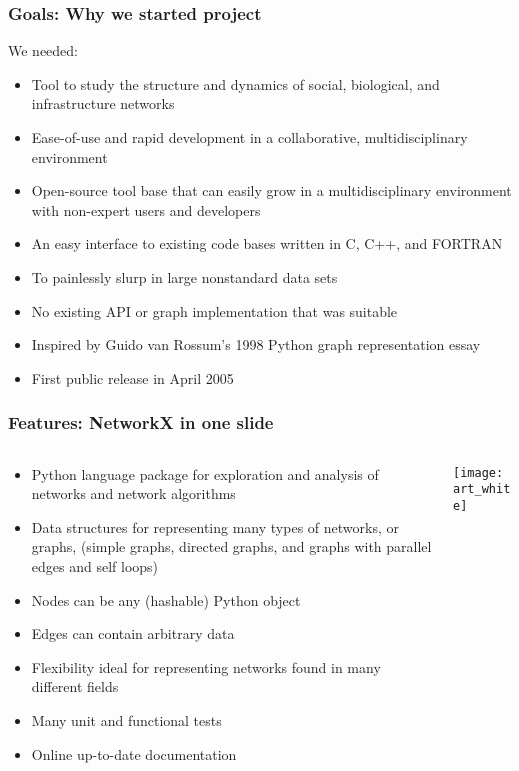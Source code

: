\documentclass[xcolor=dvipsnames, 9pt]{beamer}
\begin{document}
\begin{frame}
\frametitle{Goals: Why we started project}
\begin{block}
{We needed:}
\begin{itemize}
\item Tool to study the structure and
dynamics of social, biological, and infrastructure networks
\item Ease-of-use and rapid
development in a collaborative, multidisciplinary environment 
\item Open-source tool base that can easily
grow in a multidisciplinary environment with non-expert users and developers
\item An easy interface to 
existing code bases written in C, C++, and FORTRAN 
\item To painlessly slurp in large nonstandard data sets 
\end{itemize}
\end{block}
\begin{itemize}
\item No existing API or graph implementation that was suitable 
\item Inspired by Guido van Rossum's 1998 Python graph representation essay 
\item First public release in April 2005
\end{itemize}
\end{frame}


\begin{frame}
\frametitle{Features: NetworkX in one slide}
\begin{columns}[c]
\begin{column}{0.65\textwidth}
\begin{itemize}
\item  Python language package for exploration and analysis of
networks and network algorithms  
\item Data structures for representing many types of networks, or graphs,
(simple graphs, directed graphs, and graphs with parallel edges and
  self loops)
\item Nodes can be any (hashable) Python object
\item Edges can contain arbitrary data
\item Flexibility ideal for representing networks found
in many different fields
\item Many unit and functional tests 
\item Online up-to-date documentation
\end{itemize}
\end{column}
\begin{column}{0.35\textwidth}
\centerline{\texttt{[image: art\_white]}}
\end{column}
\end{columns}
\end{frame}
\end{document}
